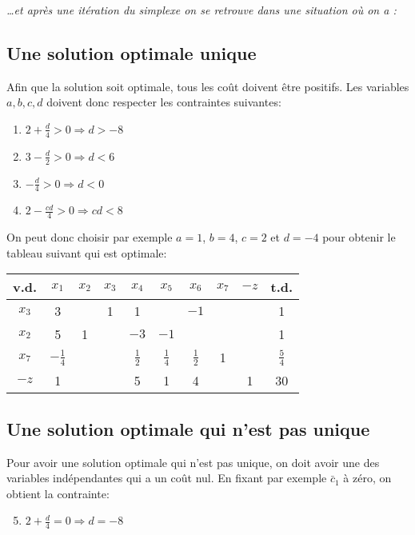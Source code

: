 \emph{\dots et après une itération du simplexe on se retrouve dans une situation où on a :}

\subsection{Une solution optimale unique}

Afin que la solution soit optimale, tous les coût doivent être positifs. Les variables $a,b,c,d$ doivent donc respecter les contraintes suivantes:
\begin{enumerate}[label=(\arabic*),itemsep=1pt]
	\item $2 + \frac{d}{4} > 0 \Rightarrow d > -8$
	\item $3 - \frac{d}{2} > 0 \Rightarrow d < 6$
	\item $ - \frac{d}{4} > 0 \Rightarrow d < 0$
	\item $2 - \frac{cd}{4} > 0 \Rightarrow cd < 8$
\end{enumerate}

On peut donc choisir par exemple $a = 1$, $b=4$, $c=2$ et $d=-4$ pour obtenir le tableau suivant qui est optimale:
	
\begin{center}
	\renewcommand{\arraystretch}{1.5}
	\begin{tabular}{|c|cccccccc|c|}
		\hline
		v.d.  &     $x_1$      & $x_2$ & $x_3$ &     $x_4$     &     $x_5$     &     $x_6$     & $x_7$ & $-z$ &     t.d.      \\ \hline
		$x_3$ &       3        &       &   1   &       1       &               &     $-1$      &       &      &       1       \\
		$x_2$ &       5        &   1   &       &     $-3$      &     $-1$      &               &       &      &       1       \\
		$x_7$ & $-\frac{1}{4}$ &       &       & $\frac{1}{2}$ & $\frac{1}{4}$ & $\frac{1}{2}$ &   1   &      & $\frac{5}{4}$ \\ \hline
		$-z$  &       1        &       &       &       5       &       1       &       4       &       &  1   &      30       \\ \hline
	\end{tabular}
\end{center}

\subsection{Une solution optimale qui n’est pas unique}
Pour avoir une solution optimale qui n’est pas unique, on doit avoir une des variables indépendantes qui a un coût nul. En fixant par exemple $\bar{c}_1$ à zéro, on obtient la contrainte:
\begin{enumerate}[label=(\arabic*),itemsep=1pt]
	\setcounter{enumi}{4}
	\item  $2 + \frac{d}{4} = 0 \Rightarrow d = -8$
\end{enumerate}

